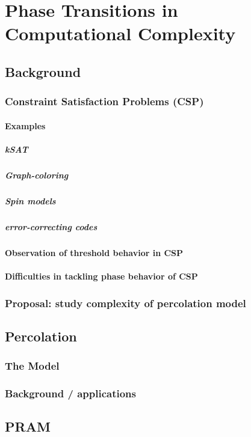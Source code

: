 \documentclass[pre,preprint]{revtex4-1}
\begin{document}
\section{Phase Transitions in Computational Complexity}
\label{sec-4}
\subsection{Background}
\label{sec-4.1}
\subsubsection{Constraint Satisfaction Problems (CSP)}
\label{sec-4.1.1}
\paragraph{Examples}
\label{sec-4.1.1.1}
\subparagraph{kSAT}
\label{sec-4.1.1.1.1}
\subparagraph{Graph-coloring}
\label{sec-4.1.1.1.2}
\subparagraph{Spin models}
\label{sec-4.1.1.1.3}
\subparagraph{error-correcting codes}
\label{sec-4.1.1.1.4}
\paragraph{Observation of threshold behavior in CSP}
\label{sec-4.1.1.2}
\paragraph{Difficulties in tackling phase behavior of CSP}
\label{sec-4.1.1.3}
\subsubsection{Proposal: study complexity of percolation model}
\label{sec-4.1.2}
\subsection{Percolation}
\label{sec-4.2}
\subsubsection{The Model}
\label{sec-4.2.1}
\subsubsection{Background / applications}
\label{sec-4.2.2}
\subsection{PRAM}
\label{sec-4.3}
\end{document}
